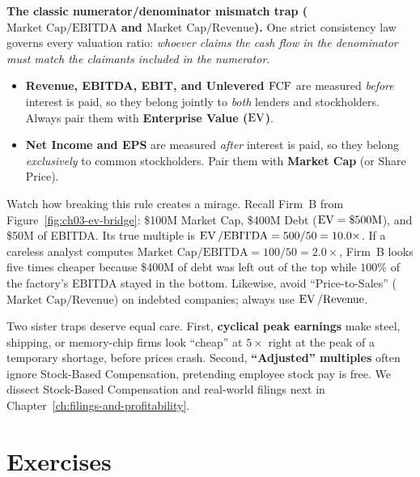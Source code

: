 \begin{trapbox}
\textbf{The classic numerator/denominator mismatch trap ($\text{Market Cap} / \text{EBITDA}$ and $\text{Market Cap} / \text{Revenue}$).}
One strict consistency law governs every valuation ratio: \emph{whoever claims the cash flow in the denominator must match the claimants included in the numerator}.
\begin{itemize}
 \item \textbf{Revenue, EBITDA, EBIT, and Unlevered $\operatorname{FCF}$} are measured \emph{before} interest is paid, so they belong jointly to \emph{both} lenders and stockholders. Always pair them with \textbf{Enterprise Value ($\operatorname{EV}$)}.
 \item \textbf{Net Income and EPS} are measured \emph{after} interest is paid, so they belong \emph{exclusively} to common stockholders. Pair them with \textbf{Market Cap} (or Share Price).
\end{itemize}
Watch how breaking this rule creates a mirage. Recall Firm~B from Figure~\ref{fig:ch03-ev-bridge}: \$100M Market Cap, \$400M Debt ($\operatorname{EV} = \$500\text{M}$), and \$50M of EBITDA. Its true multiple is $\operatorname{EV} / \text{EBITDA} = 500 / 50 = 10.0\times$. If a careless analyst computes $\text{Market Cap} / \text{EBITDA} = 100 / 50 = 2.0\times$, Firm~B looks five times cheaper because \$400M of debt was left out of the top while $100\%$ of the factory's EBITDA stayed in the bottom. Likewise, avoid ``Price-to-Sales'' ($\text{Market Cap} / \text{Revenue}$) on indebted companies; always use $\operatorname{EV} / \text{Revenue}$.

Two sister traps deserve equal care. First, \textbf{cyclical peak earnings} make steel, shipping, or memory-chip firms look ``cheap'' at $5\times$  right at the peak of a temporary shortage, before prices crash. Second, \textbf{``Adjusted'' multiples} often ignore Stock-Based Compensation, pretending employee stock pay is free. We dissect Stock-Based Compensation and real-world filings next in Chapter~\ref{ch:filings-and-profitability}.
\end{trapbox}

\section*{Exercises}

